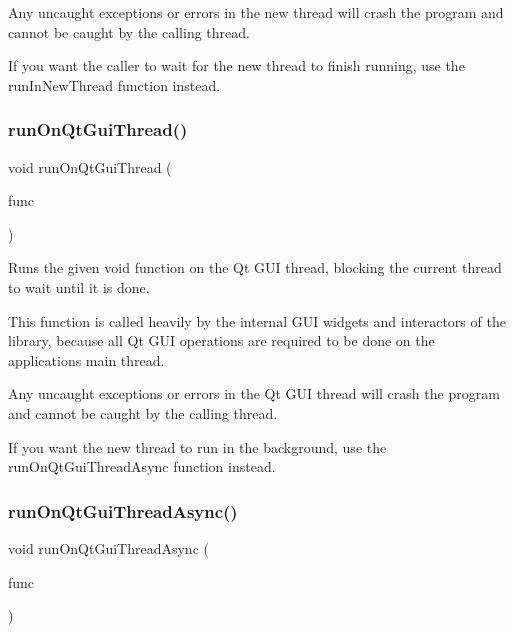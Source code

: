 Any uncaught exceptions or errors in the new thread will crash the program and cannot be caught by the calling thread.

If you want the caller to wait for the new thread to finish running, use the {\ttfamily run\+In\+New\+Thread} function instead. \mbox{\label{classGThread_a33da0c87717269710ac7a564a1ebbe64}} 
\subsubsection{\texorpdfstring{run\+On\+Qt\+Gui\+Thread()}{runOnQtGuiThread()}}
{\footnotesize\ttfamily void run\+On\+Qt\+Gui\+Thread (\begin{DoxyParamCaption}\item[{G\+Thunk}]{func }\end{DoxyParamCaption})\hspace{0.3cm}{\ttfamily [static]}}



Runs the given void function on the Qt G\+UI thread, blocking the current thread to wait until it is done. 

This function is called heavily by the internal G\+UI widgets and interactors of the library, because all Qt G\+UI operations are required to be done on the application\textquotesingle{}s main thread.

Any uncaught exceptions or errors in the Qt G\+UI thread will crash the program and cannot be caught by the calling thread.

If you want the new thread to run in the background, use the {\ttfamily run\+On\+Qt\+Gui\+Thread\+Async} function instead. \mbox{\label{classGThread_a4445680030c65d610b9e348d8d0cffc8}} 
\subsubsection{\texorpdfstring{run\+On\+Qt\+Gui\+Thread\+Async()}{runOnQtGuiThreadAsync()}}
{\footnotesize\ttfamily void run\+On\+Qt\+Gui\+Thread\+Async (\begin{DoxyParamCaption}\item[{G\+Thunk}]{func }\end{DoxyParamCaption})\hspace{0.3cm}{\ttfamily [static]}}



